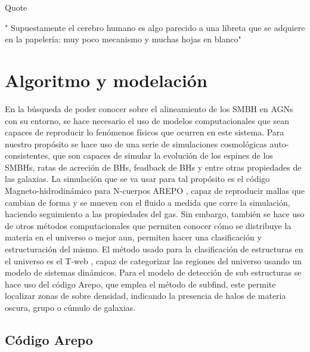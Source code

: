 Quote
\begin{savequote}[50mm]
"
Supuestamente el cerebro humano es algo parecido a una libreta que se adquiere en la papelería: muy poco mecanismo y muchas hojas en blanco"
\end{savequote}

\chapter{Algoritmo y modelación}
\label{cha:Modelo de Spin}

En la búsqueda de poder conocer sobre el alineamiento de los SMBH en AGNs con su entorno, se hace necesario el uso de modelos computacionales que sean capaces de reproducir lo fenómenos físicos que ocurren en este sistema. Para nuestro propósito se hace uso de una serie de simulaciones cosmológicas auto-consistentes, que son capaces de simular la evolución de los espines de los SMBHs, ratas de acreción de BHs, feadback de BHs y entre otras propiedades de las galaxias. La simulación que se va usar para tal propósito es el código Magneto-hidrodinámico para N-cuerpos AREPO \cite{springel2010}, capaz de reproducir mallas que cambian de forma y se mueven con el fluido a medida que corre la simulación,  haciendo seguimiento a las propiedades del gas. Sin embargo, también se hace uso de otros métodos computacionales que permiten conocer cómo se distribuye la materia en el universo o mejor aun, permiten hacer una clasificación y estructuración del mismo. El método usado para la clasificación de estructuras en el universo es el  T-web \cite{hahn2007}, capaz de categorizar las regiones del universo usando un modelo de sistemas dinámicos. Para el modelo de detección de sub estructuras se hace uso del código Arepo, que emplea el método de subfind, este permite localizar zonas de sobre densidad, indicando la presencia de halos de materia oscura, grupo o cúmulo  de galaxias. 

\section{Código Arepo}
\label{sec: codigo arepo}

